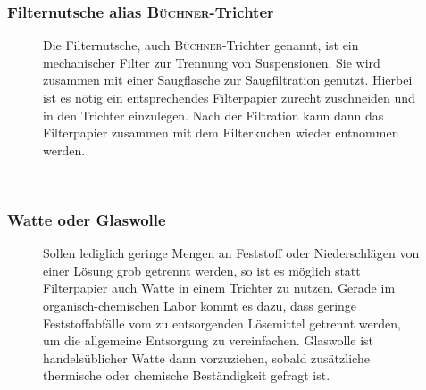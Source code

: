\subsubsection*{Filternutsche alias \textsc{Büchner}-Trichter}
\begin{figure}[h!]
	\begin{minipage}[t]{0.7\textwidth}
		\vspace{0pt}
		Die Filternutsche, auch \textsc{Büchner}-Trichter genannt, ist ein mechanischer Filter zur Trennung von Suspensionen. Sie wird zusammen mit einer Saugflasche zur Saugfiltration genutzt. Hierbei ist es nötig ein entsprechendes Filterpapier zurecht zuschneiden und in den Trichter einzulegen. Nach der Filtration kann dann das Filterpapier zusammen mit dem Filterkuchen wieder entnommen werden.
	\end{minipage}
	\hfill
	\hspace{1mm}
	\begin{minipage}[t]{0.25\textwidth}
	\end{minipage}
\end{figure}
\FloatBarrier

\\

\subsubsection*{Watte oder Glaswolle}
\begin{figure}[h!]
	\begin{minipage}[t]{0.3\textwidth}
	\end{minipage}
	\hfill
	\hspace{2mm}
	\begin{minipage}[t]{0.7\textwidth}
		\vspace{0pt}
		Sollen lediglich geringe Mengen an Feststoff oder Niederschlägen von einer Lösung grob getrennt werden, so ist es möglich statt Filterpapier auch Watte in einem Trichter zu nutzen. Gerade im organisch-chemischen Labor kommt es dazu, dass geringe Feststoffabfälle vom zu entsorgenden Lösemittel getrennt werden, um die allgemeine Entsorgung zu vereinfachen. Glaswolle ist handelsüblicher Watte dann vorzuziehen, sobald zusätzliche thermische oder chemische Beständigkeit gefragt ist.
	\end{minipage}
\end{figure}
\FloatBarrier

